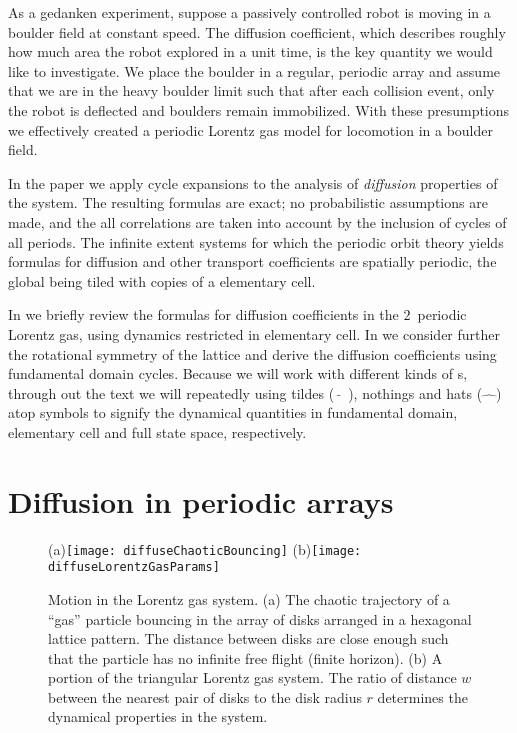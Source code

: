 \documentclass[aps,pre,
                showpacs,
                twocolumn,
                groupedaddress,
                floatfix]{revtex4-1}
\begin{document}
As a gedanken experiment, suppose a passively controlled robot is moving in a
boulder field at constant speed. The diffusion coefficient, which describes
roughly how much area the robot explored in a unit time, is the key quantity we
would like to investigate. We place the boulder in a regular, periodic array and
assume that we are in the heavy boulder limit such that after each collision
event, only the robot is deflected and boulders remain immobilized. With these
presumptions we effectively created a periodic Lorentz gas model for
locomotion in a boulder field.

In the paper we apply cycle expansions to the analysis of {\em diffusion}
properties of the system. The resulting formulas are exact; no probabilistic
assumptions are made, and the all correlations are taken into account by the
inclusion of cycles of all periods. The infinite extent systems for which the
periodic orbit theory yields formulas for diffusion and other transport
coefficients are spatially periodic, the global {\statesp} being tiled with
copies of a elementary cell.

In  we briefly review the formulas for diffusion
coefficients in the $2$\dmn\ periodic Lorentz gas, using dynamics restricted in
elementary cell. In we consider further the
rotational symmetry of the lattice and derive the diffusion coefficients using
fundamental domain cycles. Because we will work with different kinds of \statesp
s, through out the text we will repeatedly using tildes ($\tilde{\quad}$),
nothings and hats ($\hat{\quad}$) atop symbols to signify the dynamical
quantities in fundamental domain, elementary cell and full state space,
respectively.

\section{Diffusion in periodic arrays}
\label{s-DiffPerArr}

\begin{figure}[htbp]
  \begin{center}
    (a)\texttt{[image: diffuseChaoticBouncing]}
    (b)\texttt{[image: diffuseLorentzGasParams]}

  \end{center}
  \caption[]{\label{fig-chaoticBouncing} Motion in the Lorentz gas system. (a)
  The chaotic trajectory of a ``gas'' particle bouncing in the array of disks
  arranged in a hexagonal lattice pattern. The distance between disks are close
  enough such that the particle has no infinite free flight (finite horizon).
  (b) A portion of the triangular Lorentz gas
    system. The ratio of distance $w$ between the nearest pair of disks to the
    disk radius $r$ determines the dynamical properties in the system. }
\end{figure}
\end{document}
